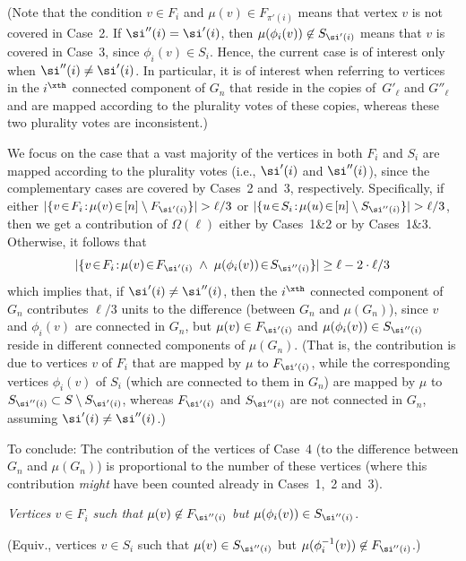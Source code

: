 (Note that the condition $v\in F_i$ and $\mu(v)\in F_{\pi'(i)}$
means that vertex $v$ is not covered in Case~2.
If $\si''(i)=\si'(i)$, then $\mu(\phi_i(v))\not\in S_{\si'(i)}$
means that $v$ is covered in Case~3, since $\phi_i(v)\in S_{i}$.
Hence, the current case is of interest only when $\si''(i)\neq\si'(i)$.
In particular, it is of interest when referring to vertices
in the $i^\xth$ connected component of $G_n$ that reside
in the copies of~$G'_\ell$ and $G''_\ell$ and are mapped
according to the plurality votes of these copies,
whereas these two plurality votes are inconsistent.)

We focus on the case that a vast majority of the vertices in
both $F_i$ and $S_i$ are mapped according to the plurality votes
(i.e., $\si'(i)$ and $\si''(i)$), since the complementary cases
are covered by Cases~2 and~3, respectively.
Specifically, if
either $|\{v\!\in\!F_i\!:\!\mu(v)\!\in\![n]\setminus F_{\si'(i)}\}|>\ell/3$
or $|\{u\!\in\!S_i\!:\!\mu(u)\!\in\![n]\setminus S_{\si''(i)}\}|>\ell/3$,
then we get a contribution of $\Omega(\ell)$
either by Cases~1\&2 or by Cases~1\&3.
%
Otherwise, it follows that
$${|\{v\!\in\!F_i\!:\!\mu(v)\!\in\!F_{\si'(i)}
    \;\wedge\; \mu(\phi_i(v))\!\in\!S_{\si''(i)}\}|}
    \geq \ell -2\cdot\ell/3$$
which implies that, if $\si'(i)\neq\si''(i)$,
then the $i^\xth$ connected component of $G_n$
contributes $\ell/3$ units to the difference
(between $G_n$ and $\mu(G_n)$),
since $v$ and $\phi_i(v)$ are connected in $G_n$,
but $\mu(v)\in F_{\si'(i)}$ and $\mu(\phi_i(v))\in S_{\si''(i)}$
reside in different connected components of $\mu(G_n)$.
(That is, the contribution is due to vertices $v$ of $F_i$
that are mapped by $\mu$ to $F_{\si'(i)}$,
while the corresponding vertices $\phi_i(v)$ of $S_i$
(which are connected to them in $G_n$) are mapped by $\mu$
to $S_{\si''(i)}\subset S\setminus S_{\si'(i)}$,
whereas $F_{\si'(i)}$ and $S_{\si''(i)}$ are not connected in $G_n$,
assuming $\si'(i)\neq\si''(i)$.)
%
%
%
%


To conclude: The contribution of the vertices of Case~4
(to the difference between $G_n$ and $\mu(G_n)$)
is proportional to the number of these vertices
(where this contribution {\em might}\/ have been counted
already in Cases~1,~2 and~3).

\item[{\em Case 5}:]
{\em Vertices $v\in F_i$ such that $\mu(v)\not\in F_{\si''(i)}$
but $\mu(\phi_i(v))\in S_{\si''(i)}$}.
%
%
%

(Equiv., vertices $v\in S_i$ such that $\mu(v)\in S_{\si''(i)}$
but $\mu(\phi_i^{-1}(v))\not\in F_{\si''(i)}$.)

